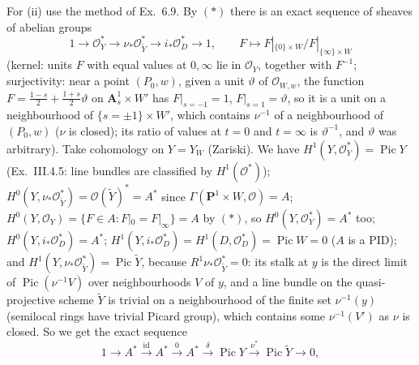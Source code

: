 \documentclass[11pt]{article}
\begin{document}
For (ii) use the method of Ex.~6.9. By $(*)$ there is an exact sequence of sheaves of abelian groups
\[
1\to\mathcal O_{Y}^*\to\nu_*\mathcal O_{\tilde Y}^*\to i_*\mathcal O_{D}^*\to1,\qquad F\mapsto F|_{\{0\}\times W}\big/F|_{\{\infty\}\times W}
\]
(kernel: units $F$ with equal values at $0,\infty$ lie in $\mathcal O_Y$, together with $F^{-1}$; surjectivity: near a point $(P_0,w)$, given a unit $\vartheta$ of $\mathcal O_{W,w}$, the function $F=\frac{1-s}2+\frac{1+s}2\vartheta$ on $\mathbf A^1_s\times W'$ has $F|_{s=-1}=1$, $F|_{s=1}=\vartheta$, so it is a unit on a neighbourhood of $\{s=\pm1\}\times W'$, which contains $\nu^{-1}$ of a neighbourhood of $(P_0,w)$ ($\nu$ is closed); its ratio of values at $t=0$ and $t=\infty$ is $\vartheta^{-1}$, and $\vartheta$ was arbitrary). Take cohomology on $Y=Y_W$ (Zariski). We have $H^1(Y,\mathcal O_Y^*)=\operatorname{Pic}Y$ (Ex.~III.4.5: line bundles are classified by $H^1(\mathcal O^*)$); $H^0(Y,\nu_*\mathcal O^*_{\tilde Y})=\mathcal O(\tilde Y)^*=A^*$ since $\Gamma(\mathbf P^1\times W,\mathcal O)=A$; $H^0(Y,\mathcal O_Y)=\{F\in A:F|_0=F|_\infty\}=A$ by $(*)$, so $H^0(Y,\mathcal O_Y^*)=A^*$ too; $H^0(Y,i_*\mathcal O^*_D)=A^*$; $H^1(Y,i_*\mathcal O_D^*)=H^1(D,\mathcal O_D^*)=\operatorname{Pic}W=0$ ($A$ is a PID); and $H^1(Y,\nu_*\mathcal O^*_{\tilde Y})=\operatorname{Pic}\tilde Y$, because $R^1\nu_*\mathcal O^*_{\tilde Y}=0$: its stalk at $y$ is the direct limit of $\operatorname{Pic}(\nu^{-1}V)$ over neighbourhoods $V$ of $y$, and a line bundle on the quasi-projective scheme $\tilde Y$ is trivial on a neighbourhood of the finite set $\nu^{-1}(y)$ (semilocal rings have trivial Picard group), which contains some $\nu^{-1}(V')$ as $\nu$ is closed. So we get the exact sequence
\[
1\to A^*\xrightarrow{\ \mathrm{id}\ }A^*\xrightarrow{\ 0\ }A^*\xrightarrow{\ \delta\ }\operatorname{Pic}Y\xrightarrow{\ \nu^*\ }\operatorname{Pic}\tilde Y\to0 ,
\]
\end{document}
